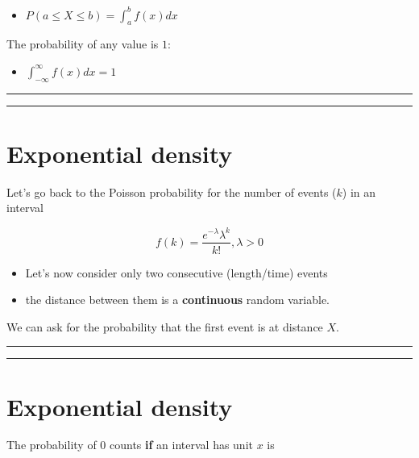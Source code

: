 \documentclass[
]{book}
\providecommand{\tightlist}{%
  \setlength{\itemsep}{0pt}\setlength{\parskip}{0pt}}
\begin{document}
\begin{itemize}
\tightlist
\item
  \(P(a\leq X \leq b)=\int_{a}^{b} f(x) dx\)
\end{itemize}

The probability of any value is \(1\):

\begin{itemize}
\tightlist
\item
  \(\int_{-\infty}^{\infty} f(x) dx = 1\)
\end{itemize}

\begin{center}\rule{0.5\linewidth}{0.5pt}\end{center}

\begin{center}\rule{0.5\linewidth}{0.5pt}\end{center}

\hypertarget{exponential-density}{%
\section{Exponential density}\label{exponential-density}}

Let's go back to the Poisson probability for the number of events (\(k\)) in an interval

\[f(k)=\frac{e^{-\lambda}\lambda^k}{k!}, \lambda>0\]

\begin{itemize}
\item
  Let's now consider only two consecutive (length/time) events
\item
  the distance between them is a \textbf{continuous} random variable.
\end{itemize}

We can ask for the probability that the first event is at distance \(X\).

\begin{center}\rule{0.5\linewidth}{0.5pt}\end{center}

\begin{center}\rule{0.5\linewidth}{0.5pt}\end{center}

\hypertarget{exponential-density-1}{%
\section{Exponential density}\label{exponential-density-1}}

The probability of \(0\) counts \textbf{if} an interval has unit \(x\) is
\end{document}
